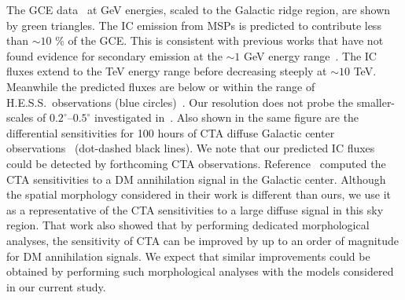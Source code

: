 \documentclass[doublespace,nopageskip]{VTthesis}
\begin{document}
The GCE data~\cite{2015MNRAS.451.1833M} at GeV energies, scaled to the Galactic ridge region, are shown by green triangles. The IC emission from MSPs is predicted to contribute less than $\sim 10$ \% of the GCE. This is consistent with previous works that have not found evidence for secondary emission at the $\sim 1$ GeV energy range~\cite{2016PhRvD..93j3004L}. The IC fluxes extend to the TeV energy range before decreasing steeply at $\sim 10$ TeV. Meanwhile the predicted fluxes are below or within the range of H.E.S.S.~observations (blue circles)~\cite{2006Natur.439..695A}. Our resolution does not probe the smaller-scales of $0.2^\circ$--$0.5^\circ$ investigated in~\citet{2018PhRvD..98d3005H}. Also shown in the same figure are the differential sensitivities for 100 hours of CTA diffuse Galactic center observations~\cite{2015JCAP...03..055S} (dot-dashed black lines). We note that our predicted IC fluxes could be detected by forthcoming CTA observations. Reference~\cite{2015JCAP...03..055S} computed the CTA sensitivities to a DM annihilation signal in the Galactic center. Although the spatial morphology considered in their work is different than ours, we use it as a representative of the CTA sensitivities to a large diffuse signal in this sky region. That work also showed that by performing dedicated morphological analyses, the sensitivity of CTA can be improved by up to an order of magnitude for DM annihilation signals. We expect that similar improvements could be obtained by performing such morphological analyses with the models considered in our current study.
\end{document}
